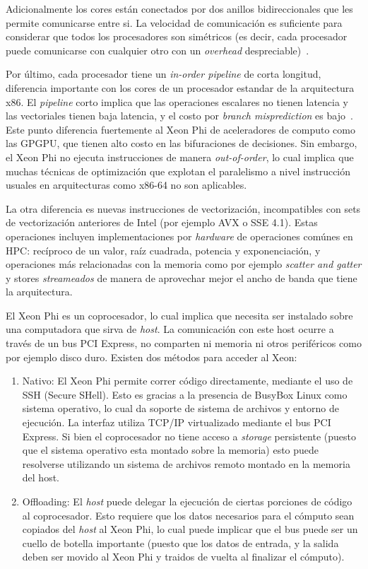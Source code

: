 Adicionalmente los cores est\'an conectados por dos anillos bidireccionales que les permite comunicarse entre si. La velocidad de
comunicaci\'on es suficiente para considerar que todos los procesadores son sim\'etricos (es decir, cada procesador puede comunicarse con
cualquier otro con un \textit{overhead} despreciable)~\cite{Fang}.

Por \'ultimo, cada procesador tiene un \textit{in-order pipeline} de corta longitud, diferencia importante con los cores de un procesador
estandar de la arquitectura x86. El \textit{pipeline} corto implica que las operaciones escalares no tienen latencia y las vectoriales tienen baja latencia,
y el costo por \textit{branch misprediction} es bajo~\cite{IntelXeonWhitePaper}. Este punto diferencia fuertemente al Xeon Phi de aceleradores de computo como las GPGPU, 
que tienen alto costo en las bifuraciones de decisiones. Sin embargo, el Xeon Phi no ejecuta instrucciones de manera \textit{out-of-order}, lo cual implica que muchas 
t\'ecnicas de optimizaci\'on que explotan el paralelismo a nivel instrucci\'on usuales en arquitecturas como x86-64 no son aplicables.

La otra diferencia es nuevas instrucciones de vectorizaci\'on, incompatibles con sets de vectorizaci\'on anteriores de Intel (por ejemplo AVX o SSE 4.1).
Estas operaciones incluyen implementaciones por \textit{hardware} de operaciones com\'unes en HPC: rec\'iproco de un valor, ra\'iz cuadrada, potencia y
exponenciaci\'on, y operaciones m\'as relacionadas con la memoria como por ejemplo \textit{scatter and gatter} y stores \textit{streameados} de manera de aprovechar
mejor el ancho de banda que tiene la arquitectura.

El Xeon Phi es un coprocesador, lo cual implica que necesita ser instalado sobre una computadora que sirva de \textit{host}. La comunicaci\'on con este host
ocurre a trav\'es de un bus PCI Express, no comparten ni memoria ni otros perif\'ericos como por ejemplo disco duro. Existen dos m\'etodos para acceder al Xeon:

\begin{enumerate}
    \item Nativo: El Xeon Phi permite correr c\'odigo directamente, mediante el uso de SSH (Secure SHell). Esto es gracias a la presencia de BusyBox Linux como sistema operativo,
    lo cual da soporte de sistema de archivos y entorno de ejecuci\'on. La interfaz utiliza TCP/IP virtualizado mediante el bus PCI Express. Si bien el coprocesador no tiene acceso a \textit{storage} persistente (puesto que el sistema operativo esta montado sobre la memoria) esto puede resolverse utilizando un sistema de archivos remoto montado en la memoria del host.
    \item Offloading: El \textit{host} puede delegar la ejecuci\'on de ciertas porciones de c\'odigo al coprocesador. Esto requiere que los datos necesarios para el c\'omputo sean copiados del \textit{host} al Xeon Phi, lo cual puede implicar que el bus puede ser un cuello de botella importante (puesto que los datos de entrada, y la salida deben ser movido al Xeon Phi y traidos de vuelta al finalizar el c\'omputo).
\end{enumerate}

